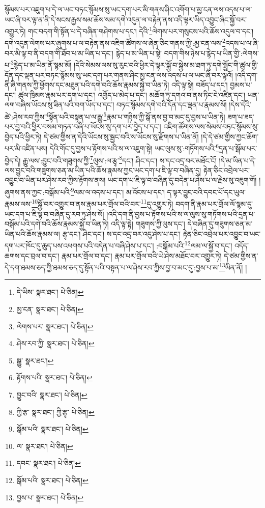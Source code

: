 སྙོམས་པར་འཇུག་པ་དེ་ལ་ཡང་བཏང་སྙོམས་སུ་ཡང་དག་པར་མི་གནས་ཤིང་འགོག་པ་མྱ་ངན་ལས་འདས་པ་ལ་ཡང་ཞི་བར་ལྟ་ན་ནི་དེ་སངས་རྒྱས་སམ་ཆོས་སམ་དགེ་འདུན་ལ་བརྟེན་ནས་འདི་ལྟར་ཡིད་འབྱུང་ཞིང་སྐྱོ་བར་འགྱུར་ཏེ། གང་བདག་གི་སྟོན་པ་དེ་བཞིན་གཤེགས་པ་དང་། དེའི་\footnote{དེ་ཡིས་  སྣར་ཐང་།  པེ་ཅིན། }ལེགས་པར་གསུངས་པའི་ཆོས་འདུལ་བ་དང་། དགེ་འདུན་ལེགས་པར་ཞུགས་པ་ལ་བརྟེན་ནས་འཇིག་ཚོགས་ལ་ཞེན་ཅིང་གནས་ཀྱི་:མྱ་ངན་ལས་\footnote{མྱ་ངན་  སྣར་ཐང་།  པེ་ཅིན། }འདས་པ་ལ་ཞི་བར་མི་ལྟ་བ་ནི་བདག་གི་ཐོབ་པ་མ་ཡིན་པ་དང་། རྙེད་པ་མ་ཡིན་པ་སྟེ། བདག་གིས་ཉེས་པ་རྙེད་པ་ཡིན་གྱི་:ལེགས་པ་\footnote{ལེགས་པར་  སྣར་ཐང་།  པེ་ཅིན། }རྙེད་པ་མ་ཡིན་ནོ་སྙམ་མོ། །དེའི་སེམས་ལས་སུ་རུང་བའི་ཕྱིར་དེ་ལྟར་སྐྱོ་བ་སྐྱེས་མ་ཐག་ཏུ་དགེ་སྦྱོང་གི་ཚུལ་གྱི་དོན་དང་ལྡན་པར་བཏང་སྙོམས་སུ་ཡང་དག་པར་གནས་ཤིང་མྱ་ངན་ལས་འདས་པ་ལ་ཡང་ཞི་བར་ལྟའོ། །འདི་དག་ནི་ཞི་གནས་ཀྱི་ཕྱོགས་དང་མཐུན་པའི་དགེ་བའི་ཆོས་རྣམས་སྐྱེ་བ་ཡིན་ཏེ། འདི་ལྟ་སྟེ། བཟོད་པ་དང་། བྱམས་པ་དང་། ཚུལ་ཁྲིམས་རྣམ་པར་དག་པ་དང་། འགྱོད་པ་མེད་པ་དང་། མཆོག་ཏུ་དགའ་བ་ནས་ཏིང་ངེ་འཛིན་དང་། ཡན་ལག་བཞིས་ཡོངས་སུ་ཟིན་པའི་བག་ཡོད་པ་དང་། བཏང་སྙོམས་དགེ་བའི་དོན་དང་ལྡན་པ་རྣམས་སོ། །དེས་དེའི་ཚེ་:ཤེས་རབ་ཀྱིས་\footnote{ཤེས་རབ་ཀྱི་  སྣར་ཐང་།  པེ་ཅིན། }སྟོན་པའི་བསྟན་པ་ལ་རྒྱུ་\footnote{སྒྱུ་  སྣར་ཐང་། }རྣམ་པ་གཉིས་ཀྱི་སྒོ་ནས་བྱ་བ་མང་དུ་བྱས་པ་ཡིན་ཏེ། ཟག་པ་ཟད་པར་བྱ་བའི་ཕྱིར་བསམ་གཏན་བཞི་པ་ཡོངས་སུ་དག་པར་བྱེད་པ་དང་། འཇིག་ཚོགས་ལས་སེམས་བཏང་སྙོམས་སུ་བྱེད་པའི་ཕྱིར་ཏེ། དེ་ཙམ་གྱིས་ན་དེའི་ཡོངས་སུ་སྦྱང་བའི་ས་ཡོངས་སུ་རྫོགས་པ་ཡིན་ནོ། །དེ་དེ་ཙམ་གྱིས་ཀྱང་ཆོག་པར་མི་འཛིན་པས། དེའི་གོང་དུ་བྱས་པ་རྟོགས་པའི་ས་ལ་འཇུག་སྟེ། ཡང་ལུས་སུ་:གཏོགས་པའི་\footnote{རྟོགས་པའི་  སྣར་ཐང་།  པེ་ཅིན། }དྲན་པ་སྒོམ་པར་བྱེད་དེ། རྒྱུ་ལས་:བྱུང་བའི་གཟུགས་ཀྱི་\footnote{བྱུང་བའི་  སྣར་ཐང་།  པེ་ཅིན། }ལུས་:ལ་རྩྭ་\footnote{ཀྱི་རྩ་  སྣར་ཐང་། ཀྱི་རྩྭ་  པེ་ཅིན། }དང་། ཤིང་དང་། ས་དང་འདྲ་བར་མཐོང་ངོ། །དེ་མ་ཡིན་པ་དེ་ལས་བྱུང་བའི་གཟུགས་ཅན་མ་ཡིན་པའི་ཆོས་རྣམས་ཀྱང་ཡང་དག་པ་ཇི་ལྟ་བ་བཞིན་དུ། རྟེན་ཅིང་འབྲེལ་པར་འབྱུང་བ་ཡིན་པར་ཤེས་རབ་ཀྱིས་རྟོགས་ནས། ཡང་དག་པ་ཇི་ལྟ་བ་བཞིན་དུ་བདེན་པ་ཤེས་པ་ལ་རྗེས་སུ་འཇུག་གོ། །ཞུགས་ནས་ཀྱང་:བསྒོམ་པའི་\footnote{སྒོམ་པའི་  སྣར་ཐང་།  པེ་ཅིན། }ལམ་ལ་འདས་པ་དང་། མ་འོངས་པ་དང་། ད་ལྟར་བྱུང་བའི་དབང་པོ་དང་ཡུལ་རྣམས་ལས་\footnote{ལ་  སྣར་ཐང་།  པེ་ཅིན། }སྐྱོ་བར་འགྱུར་བ་ནས་རྣམ་པར་གྲོལ་བའི་བར་\footnote{དབང་  སྣར་ཐང་།  པེ་ཅིན། }དུ་འགྱུར་ཏེ། བདག་ནི་རྣམ་པར་གྲོལ་ལོ་སྙམ་དུ་ཡང་དག་པ་ཇི་ལྟ་བ་བཞིན་དུ་རབ་ཏུ་ཤེས་སོ། །འདི་དག་ནི་བྱས་པ་རྟོགས་པའི་ས་ལ་ལུས་སུ་གཏོགས་པའི་དྲན་པ་བསྒོམ་པའི་དགེ་བའི་ཆོས་རྣམས་སྐྱེ་བ་ཡིན་ཏེ། འདི་ལྟ་སྟེ། གཟུགས་ཀྱི་ལུས་དང་། དེ་བཞིན་དུ་གཟུགས་ཅན་མ་ཡིན་པའི་ཆོས་རྣམས་ལ། རྩྭ་དང་། ཤིང་དང་། ས་དང་འདྲ་བར་འདུ་ཤེས་པ་དང་། རྟེན་ཅིང་འབྲེལ་པར་འབྱུང་བ་ཡང་དག་པར་ཁོང་དུ་ཆུད་པས་འཕགས་པའི་བདེན་པ་བཞི་ཤེས་པ་དང་། :བསྒོམ་པའི་\footnote{སྒོམ་པའི་  སྣར་ཐང་།  པེ་ཅིན། }ལམ་ལ་སྐྱོ་བ་དང་། འདོད་ཆགས་དང་བྲལ་བ་དང་། རྣམ་པར་གྲོལ་བ་དང་། རྣམ་པར་གྲོལ་བའི་ཡེ་ཤེས་མཐོང་བར་འགྱུར་ཏེ། དེ་ཙམ་གྱིས་ན་དེ་དག་ཐམས་ཅད་ཀྱི་ཐམས་ཅད་དུ་སྟོན་པའི་བསྟན་པ་ལ་ཤེས་རབ་ཀྱིས་བྱ་བ་མང་དུ་:བྱས་པ་མ་\footnote{བྱས་པ་  སྣར་ཐང་།  པེ་ཅིན། }ཡིན་ནོ། །
